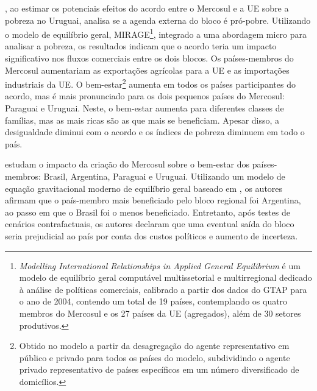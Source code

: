 \textcite{estrades12}, ao estimar os potenciais efeitos do acordo entre o Mercosul e a UE sobre a pobreza no Uruguai, analisa se a agenda externa do bloco é pró-pobre. Utilizando o modelo de equilíbrio geral, MIRAGE\footnote{\textit{Modelling International Relationships in Applied General Equilibrium} é um modelo de equilíbrio geral computável multissetorial e multirregional dedicado à análise de políticas comerciais, calibrado a partir dos dados do GTAP para o ano de 2004, contendo um total de 19 países, contemplando os quatro membros do Mercosul e os 27 países da UE (agregados), além de 30 setores produtivos.}, integrado a uma abordagem micro para analisar a pobreza, os resultados indicam que  o acordo teria um impacto significativo nos fluxos comerciais entre os dois blocos. Os países-membros do Mercosul aumentariam as exportações agrícolas para a UE e as importações industriais da UE. O bem-estar\footnote{Obtido no modelo a partir da desagregação do agente representativo em público e privado para todos os países do modelo, subdividindo o agente privado representativo de países específicos em um número diversificado de domicílios.} aumenta em todos os países participantes do acordo, mas é mais pronunciado para os dois pequenos países do Mercosul: Paraguai e Uruguai. Neste, o bem-estar aumenta para diferentes classes de famílias, mas as mais ricas são as que mais se beneficiam. Apesar disso, a desigualdade diminui com o acordo e os índices de pobreza diminuem em todo o país.

\textcite{campostimini22} estudam o impacto da criação do Mercosul sobre o bem-estar dos países-membros: Brasil, Argentina, Paraguai e Uruguai. Utilizando um modelo de equação gravitacional moderno de equilíbrio geral baseado em \textcite{arkolakis21}, os autores afirmam que o país-membro mais beneficiado pelo bloco regional foi Argentina, ao passo em que o Brasil foi o menos beneficiado. Entretanto, após testes de cenários contrafactuais, os autores declaram que uma eventual saída do bloco seria prejudicial ao país por conta dos custos políticos e aumento de incerteza.


